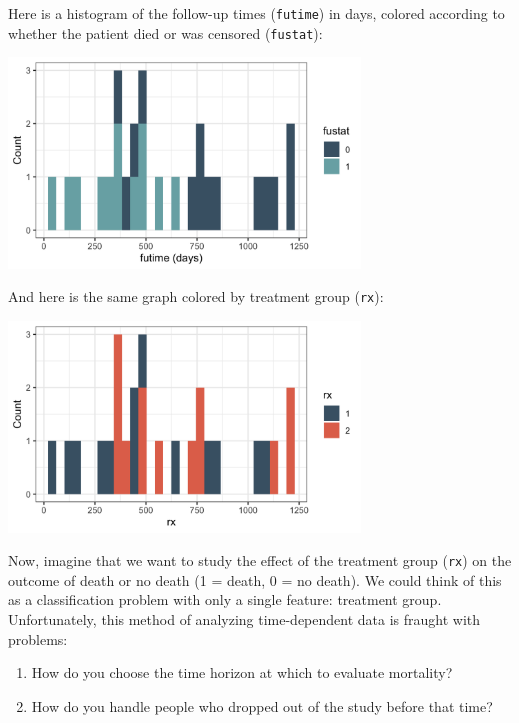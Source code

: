 \noindent Here is a histogram of the follow-up times (\texttt{futime}) in days, colored according to whether the patient died or was censored (\texttt{fustat}):

\begin{center}
\includegraphics[width=0.7\textwidth]{img/cs-ovarian-futime.png}
\end{center}

\noindent And here is the same graph colored by treatment group (\texttt{rx}):

\begin{center}
\includegraphics[width=0.7\textwidth]{img/cs-ovarian-futime2.png}
\end{center}

Now, imagine that we want to study the effect of the treatment group (\texttt{rx}) on the outcome of death or no death (1 = death, 0 = no death). We could think of this as a classification problem with only a single feature: treatment group. Unfortunately, this method of analyzing time-dependent data is fraught with problems:

\begin{enumerate}
\item How do you choose the time horizon at which to evaluate mortality?
\item How do you handle people who dropped out of the study before that time?
\end{enumerate}

